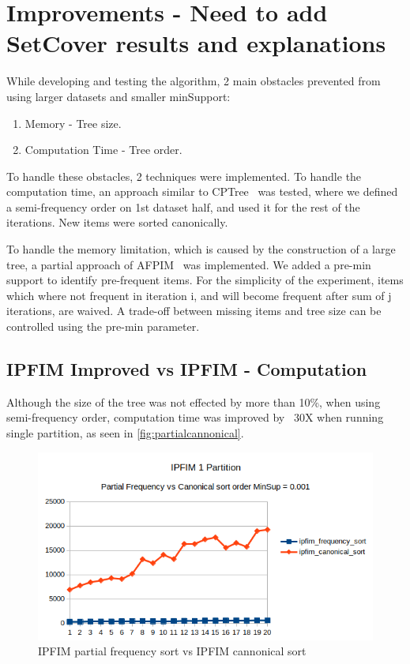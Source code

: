 
\section{Improvements - Need to add SetCover results and explanations}
\label{sec:improvements}

While developing and testing the algorithm, 2 main obstacles prevented from using larger datasets and smaller minSupport:
\begin{enumerate}
	\item Memory - Tree size.
	\item Computation Time - Tree order.
\end{enumerate}

To handle these obstacles, 2 techniques were implemented.
To handle the computation time, an approach similar to CPTree~\cite{tanbeer2009efficient} was tested, where we defined a semi-frequency order on 1st dataset half, and used it for the rest of the iterations. New items were sorted canonically.

To handle the memory limitation, which is caused by the construction of a large tree, a partial approach of AFPIM~\cite{koh2004efficient} was implemented. We added a pre-min support to identify pre-frequent items. For the simplicity of the experiment, items which where not frequent in iteration i, and will become frequent after sum of j iterations, are waived. A trade-off between missing items and tree size can be controlled using the pre-min parameter. 

\subsection{IPFIM Improved vs IPFIM - Computation}
Although the size of the tree was not effected by more than 10\%, when using semi-frequency order, computation time was improved by ~30X when running single partition, as seen in \autoref{fig:partialcannonical}.
\begin{figure}
  \centering
  \includegraphics[width=\linewidth]{figures/ipfim_freq_vs_can_sort}
  \caption{IPFIM partial frequency sort vs IPFIM cannonical sort}
  \label{fig:partialcannonical}
\end{figure}


